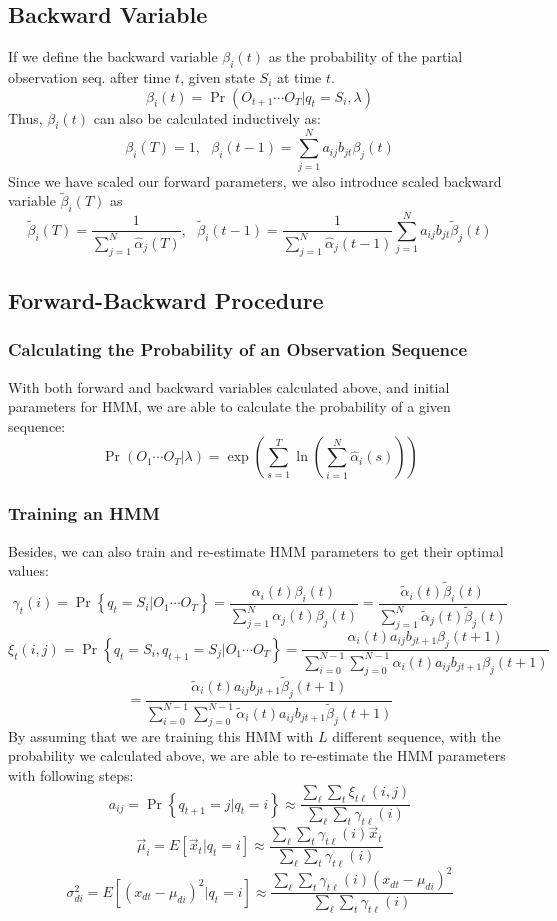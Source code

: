 \documentclass{article}
\begin{document}
	\subsection{Backward Variable}
	If we define the backward variable $\beta_i(t)$ as the probability of the partial observation seq. after time $t$, given state $S_i$ at time $t$.
	$$\beta_i(t)=\Pr(O_{t+1}\cdots O_T|q_t=S_i,\lambda)$$
	Thus, $\beta_i(t)$ can also be calculated inductively as:
	$$\beta_i(T)=1,~~~\beta_i(t-1)=\sum_{j=1}^Na_{ij}b_{jt}\beta_j(t)$$
	Since we have scaled our forward parameters, we also introduce scaled backward variable $\tilde{\beta}_i(T)$ as
	$$\tilde{\beta}_i(T)=\frac{1}{\sum_{j=1}^N\hat{\alpha}_j(T)},~~~\tilde{\beta}_i(t-1)=\frac{1}{\sum_{j=1}^N\hat{\alpha}_j(t-1)}\sum_{j=1}^Na_{ij}b_{jt}\tilde{\beta}_j(t)$$
	 
	\subsection{Forward-Backward Procedure}
	\subsubsection{Calculating the Probability of an Observation Sequence}
	With both forward and backward variables calculated above, and initial parameters for HMM, we are able to calculate the probability of a given sequence:
	$$\Pr(O_1\cdots O_T|\lambda)=\exp({\sum_{s=1}^{T}\ln(\sum_{i=1}^N\hat{\alpha}_i(s))})	$$
	\subsubsection{Training an HMM}
	Besides, we can also train and re-estimate HMM parameters to get their optimal values: 
	$$\gamma_t(i)=\Pr\left\{q_t=S_i|O_1\cdots O_T\right\}=\frac{\alpha_i(t)\beta_i(t)}{\sum_{j=1}^{N}\alpha_j(t)\beta_j(t)}=\frac{\tilde{\alpha}_i(t)\tilde{\beta}_i(t)}{\sum_{j=1}^{N}\tilde{\alpha}_j(t)\tilde{\beta}_j(t)}$$
	$$\xi_t(i,j)=\Pr\left\{q_t=S_i,q_{t+1}=S_j|O_1\cdots O_T\right\}=\frac{\alpha_i(t)a_{ij}b_{jt+1}\beta_j(t+1)}{\sum_{i=0}^{N-1}\sum_{j=0}^{N-1}\alpha_i(t)a_{ij}b_{jt+1}\beta_j(t+1)}$$
	$$=	\frac{\tilde{\alpha}_i(t)a_{ij}b_{jt+1}\tilde{\beta}_j(t+1)}{\sum_{i=0}^{N-1}\sum_{j=0}^{N-1}\tilde{\alpha}_i(t)a_{ij}b_{jt+1}\tilde{\beta}_j(t+1)}$$
	By assuming that we are training this HMM with $L$ different sequence, with the probability we calculated above, we are able to re-estimate the HMM parameters with following steps:
	$$a_{ij}=\Pr\left\{q_{t+1}=j|q_t=i\right\}\approx  \frac{\sum_\ell\sum_t \xi_{t\ell}(i,j)}{\sum_\ell\sum_t\gamma_{t\ell}(i)}$$
	$$\vec\mu_i=E\left[\vec{x}_{t}|q_t=i\right]\approx\frac{\sum_\ell\sum_t\gamma_{t\ell}(i)\vec{x}_t}{\sum_\ell\sum_t\gamma_{t\ell}(i)} $$
	$$\sigma_{di}^2=E\left[(x_{dt}-\mu_{di})^2|q_t=i\right]\approx\frac{\sum_\ell\sum_t\gamma_{t\ell}(i)(x_{dt}-\mu_{di})^2}{\sum_\ell\sum_t\gamma_{t\ell}(i)}$$
	
\end{document}
